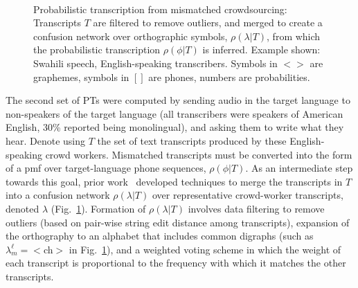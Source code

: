 \begin{figure}[b!]
\begin{center}
\\
\end{center}
\setlength{\abovecaptionskip}{0pt}
\caption{Probabilistic transcription from mismatched crowdsourcing:
  Transcripts $T$ are filtered to remove outliers, and merged to
  create a confusion network over orthographic symbols,
  $\rho(\lambda|T)$, from which the probabilistic transcription
  $\rho(\phi|T)$ is inferred. Example shown: Swahili speech,
  English-speaking transcribers.  Symbols in $<$$>$ are graphemes,
  symbols in $[]$ are phones, numbers are probabilities.}
\label{fig:mcmethods}
\end{figure}

The second set of PTs were computed by sending audio in the target
language to non-speakers of the target language (all transcribers were
speakers of American English, 30\% reported being monolingual), and
asking them to write what they hear.  Denote using $T$ the set of text
transcripts produced by these English-speaking crowd workers.
Mismatched transcripts must be converted into the form of a pmf over
target-language phone sequences, $\rho(\phi|T)$.  As an intermediate
step towards this goal, prior work~\cite{JHJ15b} developed techniques
to merge the transcripts in $T$ into a confusion network
$\rho(\lambda|T)$ over representative crowd-worker transcripts,
denoted $\lambda$ (Fig.~\ref{fig:mcmethods}).  Formation of
$\rho(\lambda|T)$ involves data filtering to remove outliers (based on
pair-wise string edit distance among transcripts), expansion of the
orthography to an alphabet that includes common digraphs (such as
$\lambda_m^\ell=<$ch$>$ in Fig.~\ref{fig:mcmethods}), and a weighted
voting scheme in which the weight of each transcript is proportional
to the frequency with which it matches the other transcripts.

